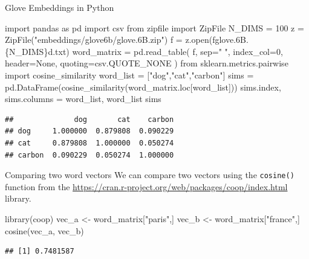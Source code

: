 \documentclass[
  10pt,
  ignorenonframetext,
  aspectratio=169]{beamer}
\newenvironment{Shaded}{\begin{snugshade}}{\end{snugshade}}
\newcommand{\BuiltInTok}[1]{\textcolor[rgb]{0.80,0.80,0.80}{#1}}
\newcommand{\DecValTok}[1]{\textcolor[rgb]{0.86,0.86,0.80}{#1}}
\newcommand{\FunctionTok}[1]{\textcolor[rgb]{0.94,0.94,0.56}{#1}}
\newcommand{\ImportTok}[1]{\textcolor[rgb]{0.80,0.80,0.80}{#1}}
\newcommand{\NormalTok}[1]{\textcolor[rgb]{0.80,0.80,0.80}{#1}}
\newcommand{\OperatorTok}[1]{\textcolor[rgb]{0.94,0.94,0.82}{#1}}
\newcommand{\OtherTok}[1]{\textcolor[rgb]{0.94,0.94,0.56}{#1}}
\newcommand{\SpecialCharTok}[1]{\textcolor[rgb]{0.86,0.64,0.64}{#1}}
\newcommand{\SpecialStringTok}[1]{\textcolor[rgb]{0.80,0.58,0.58}{#1}}
\newcommand{\StringTok}[1]{\textcolor[rgb]{0.80,0.58,0.58}{#1}}
\newcommand{\VariableTok}[1]{\textcolor[rgb]{0.80,0.80,0.80}{#1}}
\begin{document}
\begin{frame}[fragile]{Glove Embeddings in Python}
\protect\hypertarget{glove-embeddings-in-python}{}
\scriptsize

\begin{Shaded}
\begin{Highlighting}[]
\ImportTok{import}\NormalTok{ pandas }\ImportTok{as}\NormalTok{ pd}
\ImportTok{import}\NormalTok{ csv}
\ImportTok{from}\NormalTok{ zipfile }\ImportTok{import}\NormalTok{ ZipFile}
\NormalTok{N\_DIMS }\OperatorTok{=} \DecValTok{100}
\NormalTok{z }\OperatorTok{=}\NormalTok{ ZipFile(}\StringTok{"embeddings/glove6b/glove.6B.zip"}\NormalTok{)}
\NormalTok{f }\OperatorTok{=}\NormalTok{ z.}\BuiltInTok{open}\NormalTok{(}\SpecialStringTok{f\textquotesingle{}glove.6B.}\SpecialCharTok{\{}\NormalTok{N\_DIMS}\SpecialCharTok{\}}\SpecialStringTok{d.txt\textquotesingle{}}\NormalTok{)}
\NormalTok{word\_matrix }\OperatorTok{=}\NormalTok{ pd.read\_table(}
\NormalTok{    f, sep}\OperatorTok{=}\StringTok{" "}\NormalTok{, index\_col}\OperatorTok{=}\DecValTok{0}\NormalTok{, }
\NormalTok{    header}\OperatorTok{=}\VariableTok{None}\NormalTok{, quoting}\OperatorTok{=}\NormalTok{csv.QUOTE\_NONE}
\NormalTok{)}
\ImportTok{from}\NormalTok{ sklearn.metrics.pairwise }\ImportTok{import}\NormalTok{ cosine\_similarity}
\NormalTok{word\_list }\OperatorTok{=}\NormalTok{ [}\StringTok{"dog"}\NormalTok{,}\StringTok{"cat"}\NormalTok{,}\StringTok{"carbon"}\NormalTok{]}
\NormalTok{sims }\OperatorTok{=}\NormalTok{ pd.DataFrame(cosine\_similarity(word\_matrix.loc[word\_list]))}
\NormalTok{sims.index, sims.columns }\OperatorTok{=}\NormalTok{ word\_list, word\_list}
\NormalTok{sims}
\end{Highlighting}
\end{Shaded}

\begin{verbatim}
##              dog       cat    carbon
## dog     1.000000  0.879808  0.090229
## cat     0.879808  1.000000  0.050274
## carbon  0.090229  0.050274  1.000000
\end{verbatim}
\end{frame}

\begin{frame}[fragile]{Comparing two word vectors}
\protect\hypertarget{comparing-two-word-vectors}{}
We can compare two vectors using the \texttt{cosine()} function from the
\href{coop}{https://cran.r-project.org/web/packages/coop/index.html}
library.

\medskip

\begin{Shaded}
\begin{Highlighting}[]
\FunctionTok{library}\NormalTok{(coop)}
\NormalTok{vec\_a }\OtherTok{\textless{}{-}}\NormalTok{ word\_matrix[}\StringTok{"paris"}\NormalTok{,] }
\NormalTok{vec\_b }\OtherTok{\textless{}{-}}\NormalTok{ word\_matrix[}\StringTok{"france"}\NormalTok{,] }
\FunctionTok{cosine}\NormalTok{(vec\_a, vec\_b)}
\end{Highlighting}
\end{Shaded}

\begin{verbatim}
## [1] 0.7481587
\end{verbatim}
\end{frame}
\end{document}
